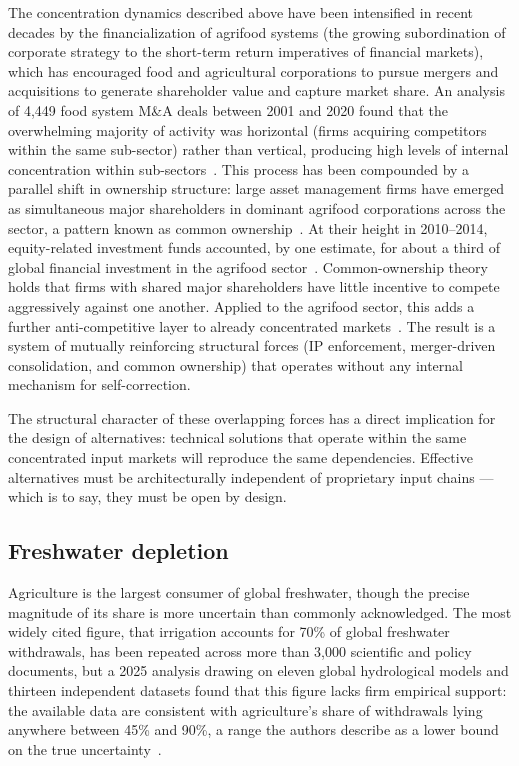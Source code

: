 The concentration dynamics described above have been intensified in recent decades by the financialization of agrifood systems (the growing subordination of corporate strategy to the short-term return imperatives of financial markets), which has encouraged food and agricultural corporations to pursue mergers and acquisitions to generate shareholder value and capture market share. An analysis of 4,449 food system M\&A deals between 2001 and 2020 found that the overwhelming majority of activity was horizontal (firms acquiring competitors within the same sub-sector) rather than vertical, producing high levels of internal concentration within sub-sectors~\cite[Abstract,~Section~4]{keenan2023financialization}. This process has been compounded by a parallel shift in ownership structure: large asset management firms have emerged as simultaneous major shareholders in dominant agrifood corporations across the sector, a pattern known as common ownership~\cite[p.~613]{clapp2019commonownership}. At their height in 2010--2014, equity-related investment funds accounted, by one estimate, for about a third of global financial investment in the agrifood sector~\cite[p.~605, citing Valoral Advisors]{clapp2019commonownership}. Common-ownership theory holds that firms with shared major shareholders have little incentive to compete aggressively against one another. Applied to the agrifood sector, this adds a further anti-competitive layer to already concentrated markets~\cite[pp.~614--615]{clapp2019commonownership}. The result is a system of mutually reinforcing structural forces (IP enforcement, merger-driven consolidation, and common ownership) that operates without any internal mechanism for self-correction.

The structural character of these overlapping forces has a direct implication for the design of alternatives: technical solutions that operate within the same concentrated input markets will reproduce the same dependencies. Effective alternatives must be architecturally independent of proprietary input chains --- which is to say, they must be open by design.

\subsection{Freshwater depletion}

Agriculture is the largest consumer of global freshwater, though the precise magnitude of its share is more uncertain than commonly acknowledged. The most widely cited figure, that irrigation accounts for 70\% of global freshwater withdrawals, has been repeated across more than 3,000 scientific and policy documents, but a 2025 analysis drawing on eleven global hydrological models and thirteen independent datasets found that this figure lacks firm empirical support: the available data are consistent with agriculture's share of withdrawals lying anywhere between 45\% and 90\%, a range the authors describe as a lower bound on the true uncertainty~\cite[Abstract; Empirical Support section]{puy2025irrigation}.

